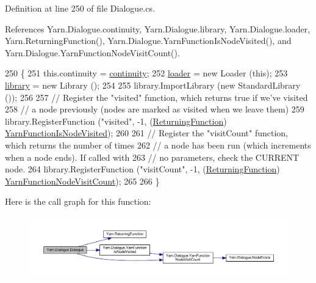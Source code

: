 Definition at line 250 of file Dialogue.\-cs.



References Yarn.\-Dialogue.\-continuity, Yarn.\-Dialogue.\-library, Yarn.\-Dialogue.\-loader, Yarn.\-Returning\-Function(), Yarn.\-Dialogue.\-Yarn\-Function\-Is\-Node\-Visited(), and Yarn.\-Dialogue.\-Yarn\-Function\-Node\-Visit\-Count().


\begin{DoxyCode}
250                                                          \{
251             this.continuity = \hyperlink{a00088_ae94eaa4b03b432422f5d205fabe37ff5}{continuity};
252             \hyperlink{a00088_a98bbe0ac2ccadeeeb7e05e3e6e19f2e0}{loader} = \textcolor{keyword}{new} Loader (\textcolor{keyword}{this});
253             \hyperlink{a00088_ae660d4cfb6e296358d2f61d8ee74c66a}{library} = \textcolor{keyword}{new} Library ();
254 
255             library.ImportLibrary (\textcolor{keyword}{new} StandardLibrary ());
256 
257             \textcolor{comment}{// Register the "visited" function, which returns true if we've visited}
258             \textcolor{comment}{// a node previously (nodes are marked as visited when we leave them)}
259             library.RegisterFunction (\textcolor{stringliteral}{"visited"}, -1, (\hyperlink{a00048_a5177bf74fbfe7303fac9d8236c2e514b}{ReturningFunction})
      \hyperlink{a00088_a1ab129bd84381928531d503304ca08d6}{YarnFunctionIsNodeVisited});
260 
261             \textcolor{comment}{// Register the "visitCount" function, which returns the number of times}
262             \textcolor{comment}{// a node has been run (which increments when a node ends). If called with}
263             \textcolor{comment}{// no parameters, check the CURRENT node.}
264             library.RegisterFunction (\textcolor{stringliteral}{"visitCount"}, -1, (\hyperlink{a00048_a5177bf74fbfe7303fac9d8236c2e514b}{ReturningFunction})
      \hyperlink{a00088_a10c9f22d3f55e74f091cd6069c431094}{YarnFunctionNodeVisitCount});
265 
266         \}
\end{DoxyCode}


Here is the call graph for this function\-:
\nopagebreak
\begin{figure}[H]
\begin{center}
\leavevmode
\includegraphics[width=350pt]{a00088_a349debf4c4b8d48e3d80ff31ad380b0e_cgraph}
\end{center}
\end{figure}





